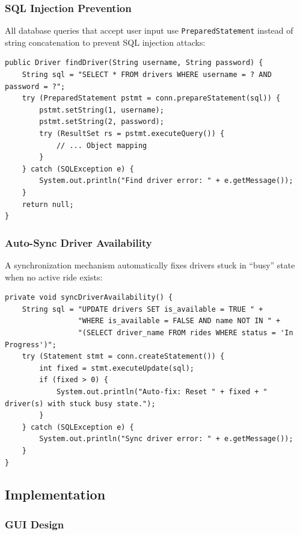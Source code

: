 \documentclass[fonts]{icst}
\begin{document}
\subsubsection{SQL Injection Prevention}

All database queries that accept user input use \texttt{PreparedStatement} instead of string concatenation to prevent SQL injection attacks:

\begin{lstlisting}[caption={Using PreparedStatement for secure queries}]
public Driver findDriver(String username, String password) {
    String sql = "SELECT * FROM drivers WHERE username = ? AND password = ?";
    try (PreparedStatement pstmt = conn.prepareStatement(sql)) {
        pstmt.setString(1, username);
        pstmt.setString(2, password);
        try (ResultSet rs = pstmt.executeQuery()) {
            // ... Object mapping
        }
    } catch (SQLException e) {
        System.out.println("Find driver error: " + e.getMessage());
    }
    return null;
}
\end{lstlisting}

\subsubsection{Auto-Sync Driver Availability}

A synchronization mechanism automatically fixes drivers stuck in ``busy'' state when no active ride exists:

\begin{lstlisting}[caption={Auto-fix stuck driver states on startup}]
private void syncDriverAvailability() {
    String sql = "UPDATE drivers SET is_available = TRUE " +
                 "WHERE is_available = FALSE AND name NOT IN " +
                 "(SELECT driver_name FROM rides WHERE status = 'In Progress')";
    try (Statement stmt = conn.createStatement()) {
        int fixed = stmt.executeUpdate(sql);
        if (fixed > 0) {
            System.out.println("Auto-fix: Reset " + fixed + " driver(s) with stuck busy state.");
        }
    } catch (SQLException e) {
        System.out.println("Sync driver error: " + e.getMessage());
    }
}
\end{lstlisting}


\subsection{Implementation}

\subsubsection{GUI Design}
\end{document}
